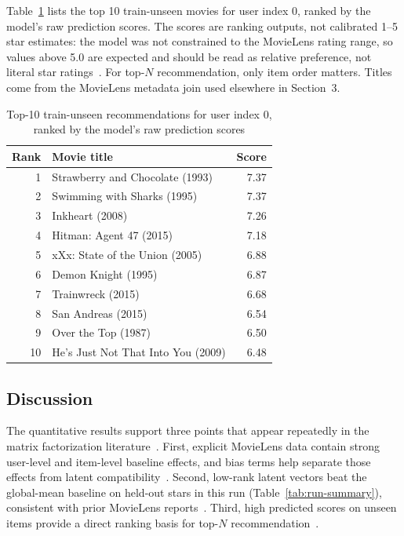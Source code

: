 \documentclass[conference]{IEEEtran}
\begin{document}
Table~\ref{tab:top10} lists the top 10 train-unseen movies for user index 0, ranked by the model's raw prediction scores. The scores are ranking outputs, not calibrated 1--5 star estimates: the model was not constrained to the MovieLens rating range, so values above 5.0 are expected and should be read as relative preference, not literal star ratings~\cite{ref3,ref4}. For top-$N$ recommendation, only item order matters. Titles come from the MovieLens metadata join used elsewhere in Section~3.

\begin{table}[htbp]
\caption{Top-10 train-unseen recommendations for user index 0, ranked by the model's raw prediction scores}
\label{tab:top10}
\begin{center}
\small
\begin{tabular}{|r|l|r|}
\hline
\textbf{Rank} & \textbf{Movie title} & \textbf{Score} \\
\hline
1 & Strawberry and Chocolate (1993) & 7.37 \\
2 & Swimming with Sharks (1995) & 7.37 \\
3 & Inkheart (2008) & 7.26 \\
4 & Hitman: Agent 47 (2015) & 7.18 \\
5 & xXx: State of the Union (2005) & 6.88 \\
6 & Demon Knight (1995) & 6.87 \\
7 & Trainwreck (2015) & 6.68 \\
8 & San Andreas (2015) & 6.54 \\
9 & Over the Top (1987) & 6.50 \\
10 & He's Just Not That Into You (2009) & 6.48 \\
\hline
\end{tabular}
\end{center}
\end{table}

\subsection{Discussion}

The quantitative results support three points that appear repeatedly in the matrix factorization literature~\cite{ref1,ref2,ref3,ref4}. First, explicit MovieLens data contain strong user-level and item-level baseline effects, and bias terms help separate those effects from latent compatibility~\cite{ref2,ref3}. Second, low-rank latent vectors beat the global-mean baseline on held-out stars in this run (Table~\ref{tab:run-summary}), consistent with prior MovieLens reports~\cite{ref1,ref2}. Third, high predicted scores on unseen items provide a direct ranking basis for top-$N$ recommendation~\cite{ref3,ref4}.
\end{document}
